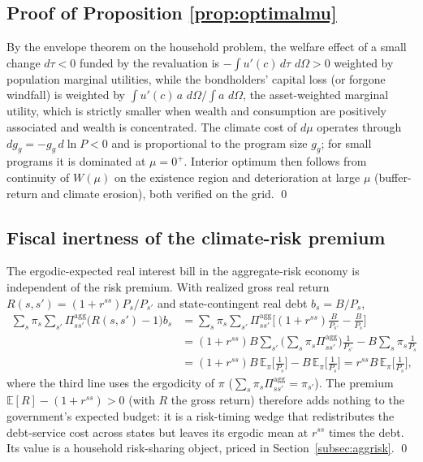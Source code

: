 \documentclass[12pt]{article}
\newcommand{\E}{\mathbb{E}}
\newcommand{\dd}{\,d}
\begin{document}
\subsection{Proof of Proposition \ref{prop:optimalmu}}
By the envelope theorem on the household problem, the welfare effect of a
small change $d\tau<0$ funded by the revaluation is
$-\int u'(c)\,d\tau\,\dd\Omega>0$ weighted by population marginal utilities,
while the bondholders' capital loss (or forgone windfall) is weighted by
$\int u'(c)\,a\,\dd\Omega / \int a\,\dd\Omega$, the asset-weighted marginal
utility, which is strictly smaller when wealth and consumption are positively
associated and wealth is concentrated. The climate cost of $d\mu$ operates
through $dg_g=-g_g\,d\ln P<0$ and is proportional to the program size
$g_g$; for small programs it is dominated at $\mu=0^{+}$. Interior optimum
then follows from continuity of $W(\mu)$ on the existence region and
deterioration at large $\mu$ (buffer-return and climate erosion), both
verified on the grid. \qed

\subsection{Fiscal inertness of the climate-risk premium}
The ergodic-expected real interest bill in the aggregate-risk economy is
independent of the risk premium. With realized gross real return
$R(s,s')=(1+r^{ss})P_s/P_{s'}$ and state-contingent real debt $b_s=B/P_s$,
\begin{align*}
\sum_s \pi_s \sum_{s'}\Pi^{\mathrm{agg}}_{ss'}\big(R(s,s')-1\big)b_s
&=\sum_s \pi_s \sum_{s'}\Pi^{\mathrm{agg}}_{ss'}
   \Big[(1+r^{ss})\tfrac{B}{P_{s'}}-\tfrac{B}{P_s}\Big]\\
&=(1+r^{ss})B\sum_{s'}\Big(\textstyle\sum_s \pi_s \Pi^{\mathrm{agg}}_{ss'}\Big)\tfrac{1}{P_{s'}}
  - B\sum_s \pi_s \tfrac{1}{P_s}\\
&=(1+r^{ss})B\,\E_\pi\!\big[\tfrac{1}{P_s}\big]-B\,\E_\pi\!\big[\tfrac{1}{P_s}\big]
  = r^{ss}B\,\E_\pi\!\big[\tfrac{1}{P_s}\big],
\end{align*}
where the third line uses the ergodicity of $\pi$
($\sum_s \pi_s \Pi^{\mathrm{agg}}_{ss'}=\pi_{s'}$). The premium
$\mathbb{E}[R]-(1+r^{ss})>0$ (with $R$ the gross return) therefore adds
nothing to the government's expected
budget: it is a risk-timing wedge that redistributes the debt-service cost
across states but leaves its ergodic mean at $r^{ss}$ times the debt. Its
value is a household risk-sharing object, priced in
Section~\ref{subsec:aggrisk}. \qed
\end{document}
